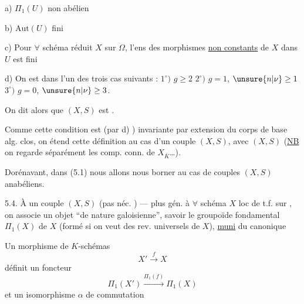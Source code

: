 a) $\Pi_1(U)$ non abélien

b) $\mathrm{Aut}(U)$ fini

c) Pour $\forall$ schéma  réduit $X$  sur $\Omega$, l'ens des morphismes \uline{non constants} de $X$ dans $U$ est fini

d) On est dans l'un des trois cas suivants : $1^\circ)$  $g\geq 2$ \quad $2^\circ)$ $g=1$, $\unsure{n|\nu}\geq 1$ \quad $3^\circ)$ $g=0$, $\unsure{n|\nu}\geq 3$.


 On dit alors que $(X,S)$ est . 

Comme cette condition est (par d) ) invariante par extension du corps de base alg. clos, on étend cette définition au cas d'un couple $(X,S)$, avec $(X,S)$   (\uline{NB} on regarde séparément les comp. conn. de $X_{\overline K}$\dots).


Dorénavant, dans (5.1) nous allons nous borner au cas de couples
$(X,S)$ anabéliens.


5.4. À un couple $(X,S)$ (pas néc. ) --- plus gén. à
$\forall$ schéma $X$ loc de t.f. sur , on associe un
objet ``de nature galoisienne'', savoir le groupoïde fondamental
 $\Pi_1(X)$ de $X$ (formé si on veut des rev.
universels de $X$), \uline{muni} du 
 canonique

Un morphisme de $K$-schémas
\[
X' \xrightarrow{f} X
\]
définit un foncteur
\[
\Pi_1(X') \xrightarrow{\Pi_1(f)} \Pi_1(X)
\]
et un isomorphisme $\alpha$ de commutation

